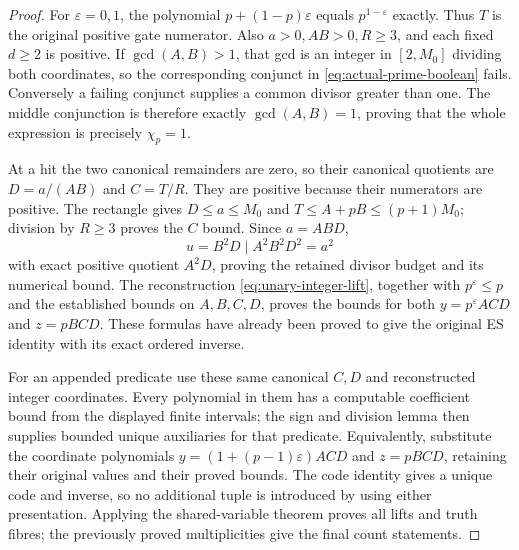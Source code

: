 \begin{proof}
For \(\varepsilon=0,1\), the polynomial
\(p+(1-p)\varepsilon\) equals \(p^{1-\varepsilon}\)
exactly.  Thus \(T\) is the original positive gate numerator.
Also \(a>0,AB>0,R\ge3\), and each fixed \(d\ge2\) is
positive.  If \(\gcd(A,B)>1\), that gcd is an integer in
\([2,M_0]\) dividing both coordinates, so the corresponding
conjunct in \eqref{eq:actual-prime-boolean} fails.
Conversely a failing conjunct supplies a common divisor
greater than one.  The middle conjunction is therefore
exactly \(\gcd(A,B)=1\), proving that the whole expression
is precisely \(\chi_p=1\).

At a hit the two canonical remainders are zero, so their
canonical quotients are \(D=a/(AB)\) and \(C=T/R\).
They are positive because their numerators are positive.
The rectangle gives \(D\le a\le M_0\) and
\(T\le A+pB\le(p+1)M_0\); division by \(R\ge3\)
proves the \(C\) bound.  Since \(a=ABD\),
\[
 u=B^2D\mid A^2B^2D^2=a^2
\]
with exact positive quotient \(A^2D\), proving the
retained divisor budget and its numerical bound.
The reconstruction \eqref{eq:unary-integer-lift},
together with \(p^\varepsilon\le p\) and the established
bounds on \(A,B,C,D\), proves the bounds for both
\(y=p^\varepsilon ACD\) and \(z=pBCD\).
These formulas have already been proved to give the
original ES identity with its exact ordered inverse.

For an appended predicate use these same canonical \(C,D\)
and reconstructed integer coordinates.  Every polynomial
in them has a computable coefficient bound from the
displayed finite intervals; the sign and division lemma
then supplies bounded unique auxiliaries for that predicate.
Equivalently, substitute the coordinate polynomials
\(y=(1+(p-1)\varepsilon)ACD\) and \(z=pBCD\),
retaining their original values and their proved bounds.
The code identity gives a unique code and inverse, so no
additional tuple is introduced by using either presentation.
Applying the shared-variable theorem proves all lifts and
truth fibres; the previously proved multiplicities give
the final count statements.
\end{proof}
